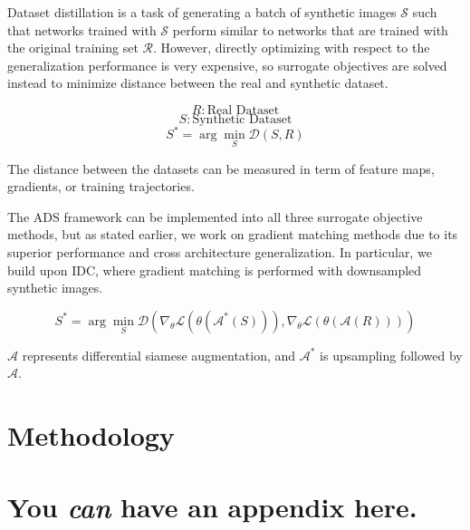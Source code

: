 \documentclass{article}
\theoremstyle{plain}
\theoremstyle{definition}
\theoremstyle{remark}
\begin{document}
Dataset distillation is a task of generating a batch of synthetic images $\mathcal{S}$ such that networks trained with $\mathcal{S}$ perform similar to networks that are trained with the original training set $\mathcal{R}$. However, directly optimizing with respect to the generalization performance is very expensive, so surrogate objectives are solved instead to minimize distance between the real and synthetic dataset.

\begin{equation}
R: \text{Real Dataset}
\end{equation}
\begin{equation}
S: \text{Synthetic Dataset}
\end{equation}
\begin{equation}
S^* = \arg \min_{S} \mathcal{D}(S,R)
\end{equation}

The distance between the datasets can be measured in term of feature maps, gradients, or training trajectories. 

The  ADS framework can be implemented into all three surrogate objective methods, but as stated earlier, we work on gradient matching methods due to its superior performance and cross architecture generalization. In particular, we build upon IDC, where gradient matching is performed with downsampled synthetic images.

\begin{equation}
S^* = \arg \min_{S} \mathcal{D} \left( \nabla_{\theta} \mathcal{L}(\theta(\mathcal{A}^*(S))), \nabla_{\theta} \mathcal{L}(\theta(\mathcal{A}(R))) \right)
\end{equation}

$\mathcal{A}$ represents differential siamese augmentation, and $\mathcal{A}^*$ is upsampling followed by $\mathcal{A}$.

\section{Methodology}









\newpage
\appendix
\onecolumn
\section{You \emph{can} have an appendix here.}

\end{document}
